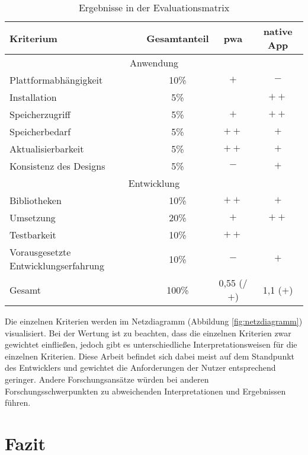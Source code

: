 \begin{table}[h!]
	\centering
	\begin{tabular}{|l|c|c|c|}
		\hline
		Kriterium              & Gesamtanteil & \ac{pwa} & native App\\
		
		\hline
		\multicolumn{4}{c}{Anwendung}         \\
		\hline
		Plattformabhängigkeit   & 10\%         & $+$ & $-$\\
		Installation           & 5\%          & \Circle & $++$ \\
		Speicherzugriff        & 5\%          & $+$&$++$ \\
		Speicherbedarf         & 5\%          & $++$& $+$\\
		Aktualisierbarkeit     & 5\%          & $++$&$+$ \\
		Konsistenz des Designs & 5\%         & $-$& $+$\\
		
		\hline
		\multicolumn{4}{c}{Entwicklung}      \\
		\hline
		Bibliotheken           & 10\%         &$++$ &$+$ \\
		Umsetzung              & 20\%         &$+$ &$++$ \\
		Testbarkeit            & 10\%         & $++$& \Circle\\
		Vorausgesetzte Entwicklungserfahrung    & 10\%         &$-$ &$+$ \\
		\hline
		\hline
		Gesamt                  & 100\%        & 0,55 (\Circle/$+$) & 1,1 ($+$)\\
		\hline
	\end{tabular}
	\caption{Ergebnisse in der Evaluationsmatrix} \label{tab:evaluationsmatrix_ausgefüllt}
\end{table}

Die einzelnen Kriterien werden im Netzdiagramm (Abbildung \ref{fig:netzdiagramm}) visualisiert. Bei der Wertung ist zu beachten, dass die einzelnen Kriterien zwar gewichtet einfließen, jedoch gibt es unterschiedliche Interpretationsweisen für die einzelnen Kriterien. Diese Arbeit befindet sich dabei meist auf dem Standpunkt des Entwicklers und gewichtet die Anforderungen der Nutzer entsprechend geringer. Andere Forschungsansätze würden bei anderen Forschungsschwerpunkten zu abweichenden Interpretationen und Ergebnissen führen.


\section{Fazit}

